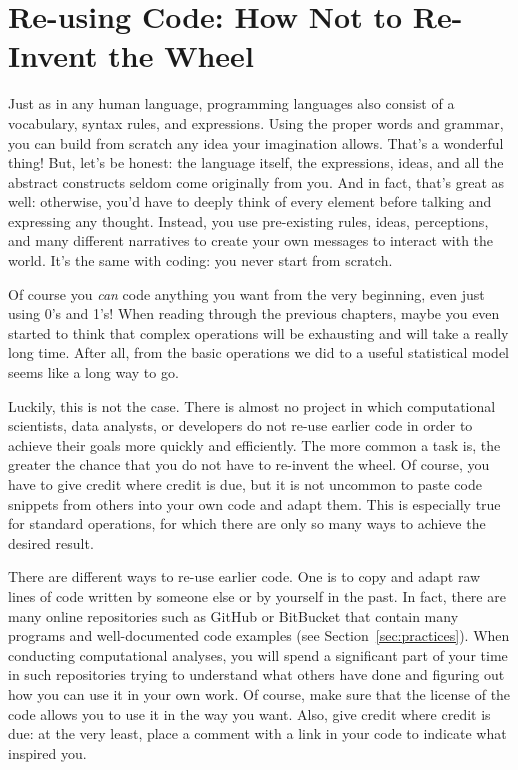 %

\section{Re-using Code: How Not to Re-Invent the Wheel}
\label{sec:code}

Just as in any human language,  programming languages also consist of a vocabulary, syntax rules, and expressions. Using the proper words and grammar, you can build from scratch any idea your imagination allows. That's a wonderful thing! But, let's be honest: the language itself, the expressions, ideas, and all the abstract constructs seldom come originally from you. And in fact, that's great as well: otherwise, you'd have to deeply think of every element before talking and expressing any thought. Instead, you use pre-existing rules, ideas, perceptions, and many different narratives to create your own messages to interact with the world. It's the same with coding: you never start from scratch.

Of course you \emph{can} code anything you want from the very beginning, even just using 0's and 1's!
When reading through the previous chapters, maybe you even started to think that complex operations will be  exhausting and will take a really long time. After all, from the basic operations we did to a useful statistical model seems like a long way to go.

Luckily, this is not the case.
There is almost no project in which computational scientists, data analysts, or developers do not re-use earlier code in order to achieve their goals more quickly and  efficiently.
The more common a task is, the greater the chance that you do not have to re-invent the wheel.
Of course, you have to give credit where credit is due, but it is not uncommon to paste code snippets from others into your own code and adapt them. This is especially true for standard operations, for which there are only so many ways to  achieve the desired result.

There are different ways to re-use earlier code. One is to copy and adapt raw lines of code written by someone else or by yourself in the past. In fact, there are many online repositories such as GitHub or BitBucket that contain many programs and well-documented code examples (see Section~\ref{sec:practices}). When conducting computational analyses, you will spend a significant part of your time in such repositories trying to understand what others have done and figuring out how you can use it in your own work. Of course, make sure that the license of the code allows you to use it in the way you want. Also, give credit where credit is due: at the very least, place a comment with a link in your code to indicate what inspired you.

